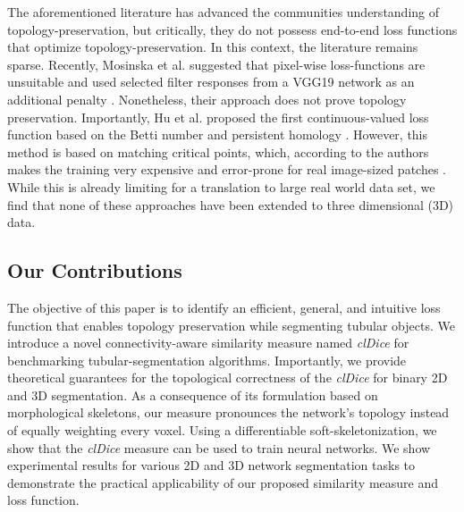 The aforementioned literature has advanced the communities understanding of topology-preservation, but critically, they do not possess end-to-end loss functions that optimize topology-preservation. %
In this context, the literature remains sparse. Recently, %
Mosinska et al. suggested that pixel-wise loss-functions are unsuitable and used selected filter responses from a VGG19 network as an additional penalty \cite{mosinska2018beyond}. Nonetheless, their approach does not prove topology preservation. Importantly, Hu et al. proposed the first continuous-valued loss function based on the Betti number and persistent homology \cite{hu2019topology}. However, this method is based on matching critical points, which, according to the authors makes the training very expensive and error-prone for real image-sized patches \cite{hu2019topology}. While this is already limiting for a translation to large real world data set, we find that none of these approaches have been extended to three dimensional (3D) data.


\subsection{Our Contributions}
The objective of this paper is to identify an efficient, general, and intuitive loss function that enables topology preservation while segmenting tubular objects. 
We introduce a novel connectivity-aware similarity measure named \textit{clDice} for benchmarking tubular-segmentation algorithms. 
Importantly, we provide theoretical guarantees for the topological correctness of the \textit{clDice} for binary 2D and 3D segmentation. As a consequence of its formulation based on morphological skeletons, our measure pronounces the network's topology instead of equally weighting every voxel.
Using a differentiable soft-skeletonization, we show that the \textit{clDice} measure can be used to train neural networks. 
We show experimental results for various 2D and 3D network segmentation tasks to demonstrate the practical applicability of our proposed similarity measure and loss function.